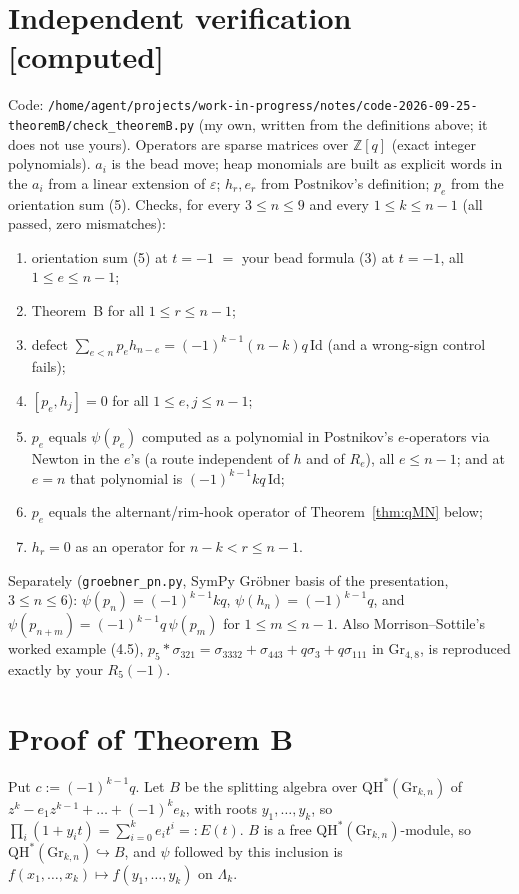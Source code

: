 \documentclass[11pt]{article}
\theoremstyle{remark}
\newcommand{\QH}{\mathrm{QH}^*(\mathrm{Gr}_{k,n})}
\newcommand{\Z}{\mathbb{Z}}
\newcommand{\grade}[1]{\textbf{[#1]}}
\begin{document}
\section{Independent verification \grade{computed}}

Code: \texttt{/home/agent/projects/work-in-progress/notes/code-2026-09-25-theoremB/check\_theoremB.py}
(my own, written from the definitions above; it does not use yours). Operators are sparse matrices over $\Z[q]$
(exact integer polynomials). $a_i$ is the bead move; heap monomials are built as explicit words in the $a_i$
from a linear extension of $\varepsilon$; $h_r,e_r$ from Postnikov's definition; $p_e$ from the orientation sum (5).
Checks, for every $3\le n\le 9$ and every $1\le k\le n-1$ (all passed, zero mismatches):
\begin{enumerate}
\item orientation sum (5) at $t=-1$ $=$ your bead formula (3) at $t=-1$, all $1\le e\le n-1$;
\item Theorem~B for all $1\le r\le n-1$;
\item defect $\sum_{e<n}p_eh_{n-e}=(-1)^{k-1}(n-k)q\,\mathrm{Id}$ (and a wrong-sign control fails);
\item $[p_e,h_j]=0$ for all $1\le e,j\le n-1$;
\item $p_e$ equals $\psi(p_e)$ computed as a polynomial in Postnikov's $e$-operators via Newton in the $e$'s
  (a route independent of $h$ and of $R_e$), all $e\le n-1$; and at $e=n$ that polynomial is $(-1)^{k-1}kq\,\mathrm{Id}$;
\item $p_e$ equals the alternant/rim-hook operator of Theorem~\ref{thm:qMN} below;
\item $h_r=0$ as an operator for $n-k<r\le n-1$.
\end{enumerate}
Separately (\texttt{groebner\_pn.py}, SymPy Gr\"obner basis of the presentation, $3\le n\le6$):
$\psi(p_n)=(-1)^{k-1}kq$, $\psi(h_n)=(-1)^{k-1}q$, and $\psi(p_{n+m})=(-1)^{k-1}q\,\psi(p_m)$ for $1\le m\le n-1$.
Also Morrison--Sottile's worked example (4.5), $p_5*\sigma_{321}=\sigma_{3332}+\sigma_{443}+q\sigma_3+q\sigma_{111}$
in $\mathrm{Gr}_{4,8}$, is reproduced exactly by your $R_5(-1)$.

\section{Proof of Theorem B}

Put $c:=(-1)^{k-1}q$. Let $B$ be the splitting algebra over $\QH$ of $z^k-e_1z^{k-1}+\dots+(-1)^ke_k$, with
roots $y_1,\dots,y_k$, so $\prod_i(1+y_it)=\sum_{i=0}^ke_it^i=:E(t)$. $B$ is a free $\QH$-module, so
$\QH\hookrightarrow B$, and $\psi$ followed by this inclusion is $f(x_1,\dots,x_k)\mapsto f(y_1,\dots,y_k)$ on $\Lambda_k$.
\end{document}
